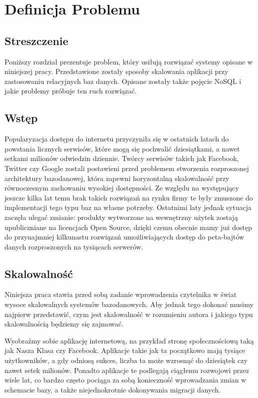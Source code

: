 \chapter{Definicja Problemu}

\section*{Streszczenie}
Poniższy rozdział prezentuje problem, który usiłują rozwiązać systemy opisane w niniejszej pracy.
Przedstawione zostały sposoby skalowania aplikacji przy zastosowaniu relacyjnych baz danych.
Opisane zostały także pojęcie NoSQL i jakie problemy próbuje ten ruch rozwiązać.

\section{Wstęp}
Popularyzacja dostępu do internetu przyczyniła się w ostatnich latach do  powstania licznych serwisów, które mogą się pochwalić dziesiątkami, a nawet setkami milionów odwiedzin dziennie. 
Twórcy serwisów takich jak Facebook, Twitter czy Google zostali postawieni przed problemem stworzenia rozproszonej architektury bazodanowej, która zapewni horyzontalną skalowalność przy równoczesnym zachowaniu wysokiej dostępności. 
Ze względu na występujący jeszcze kilka lat temu brak takich rozwiązań na rynku firmy te były zmuszone do implementacji tego typu baz na własne potrzeby. 
Ostatnimi laty jednak sytuacja zaczęła ulegać zmianie: produkty wytworzone na wewnętrzny użytek zostają upubliczniane na licencjach Open Source, dzięki czemu obecnie mamy już dostęp do przynajmniej kilkunastu rozwiązań umożliwiających dostęp do peta-bajtów danych rozproszonych na tysiącach serwerów.

\section{Skalowalność}
Niniejsza praca stawia przed sobą zadanie wprowadzenia czytelnika w świat wysoce skalowalnych systemów bazodanowych.
Aby jednak tego dokonać musimy najpierw przedstawić, czym jest skalowalność w rozumieniu autora i jakiego typu skalowalnością będziemy się zajmować.

Wyobraźmy sobie aplikację internetową, na przykład stronę społecznościową taką jak Nasza Klasa czy Facebook.
Aplikacje takie jak ta początkowo mają tysiące użytkowników, a gdy odniosą sukces, liczba ta może wzrosnąć do dziesiątek czy nawet setek milionów.
Ponadto aplikacje te podlegają ciągłemu rozwojowi przez wiele lat, co bardzo często pociąga za sobą konieczność wprowadzania zmian w schemacie bazy, a także niejednokrotnie dokonywania migracji danych.


